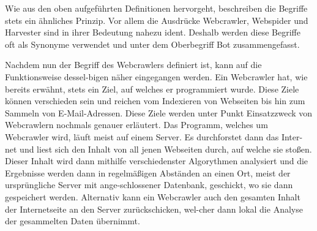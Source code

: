 Wie aus den oben aufgeführten Definitionen hervorgeht, beschreiben die Begriffe stets ein ähnliches Prinzip. Vor allem die Ausdrücke Webcrawler, Webspider und Harvester sind in ihrer Bedeutung nahezu ident. Deshalb werden diese Begriffe oft als Synonyme verwendet und unter dem Oberbegriff Bot zusammengefasst.  








Nachdem nun der Begriff des Webcrawlers definiert ist, kann auf die Funktionsweise dessel-bigen näher eingegangen werden. Ein Webcrawler hat, wie bereits erwähnt, stets ein Ziel, auf welches er programmiert wurde. Diese Ziele können verschieden sein und reichen vom Indexieren von Webseiten bis hin zum Sammeln von E-Mail-Adressen. Diese Ziele werden unter Punkt Einsatzzweck von Webcrawlern nochmals genauer erläutert. Das Programm, welches um Webcrawler wird, läuft meist auf einem Server. Es durchforstet dann das Inter-net und liest sich den Inhalt von all jenen Webseiten durch, auf welche sie stoßen. Dieser Inhalt wird dann mithilfe verschiedenster Algorythmen analysiert und die Ergebnisse werden dann in regelmäßigen Abständen an einen Ort, meist der ursprüngliche Server mit ange-schlossener Datenbank, geschickt, wo sie dann gespeichert werden. Alternativ kann ein Webcrawler auch den gesamten Inhalt der Internetseite an den Server zurückschicken, wel-cher dann lokal die Analyse der gesammelten Daten übernimmt. 
